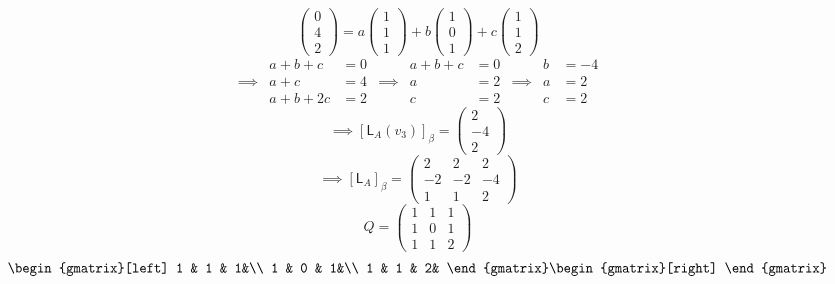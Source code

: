\begin{enumerate}[(a)]
\begin{equation}
\begin{pmatrix}0\\4\\2\end{pmatrix}=
a\begin{pmatrix}1\\1\\1\end{pmatrix} +
b\begin{pmatrix}1\\0\\1\end{pmatrix} +
c\begin{pmatrix}1\\1\\2\end{pmatrix}
\end{equation}
\begin{align*}
& a+b+c &=0 & & a+b +c &=0 & & b &= -4\\
\implies& a +c &=4 &\implies& a &= 2 &\implies& a &=2\\
& a+b + 2c &= 2 & & c &=2 & &c &=2
\end{align*}
\begin{equation}
\implies \left[\mathsf{L}_A(v_3)\right]_\beta = \begin{pmatrix}2\\-4\\2\end{pmatrix}
\end{equation}
\begin{equation}
\implies [\mathsf{L}_A]_\beta = \begin{pmatrix}2&2&2\\-2&-2&-4\\1&1&2\end{pmatrix}
\end{equation}
\begin{equation}
Q = \begin{pmatrix}
1 & 1 & 1\\
1 & 0 & 1\\
1 & 1 & 2
\end{pmatrix}
\end{equation}
\begin{equation*}
\begin{gmatrix}[left]
1 & 1 & 1&\\
1 & 0 & 1&\\
1 & 1 & 2&
\end{gmatrix}
\begin{gmatrix}[right]

\end{gmatrix}
\end{equation*}
\end{enumerate}
